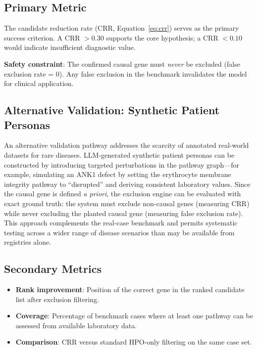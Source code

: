 \documentclass[12pt,a4paper]{article}
\begin{document}
\subsection{Primary Metric}

The candidate reduction rate (CRR, Equation~\eqref{eq:crr}) serves as the primary success criterion. A CRR $> 0.30$ supports the core hypothesis; a CRR $< 0.10$ would indicate insufficient diagnostic value.

\textbf{Safety constraint}: The confirmed causal gene must \emph{never} be excluded (false exclusion rate = 0). Any false exclusion in the benchmark invalidates the model for clinical application.

\subsection{Alternative Validation: Synthetic Patient Personas}

An alternative validation pathway addresses the scarcity of annotated real-world datasets for rare diseases. LLM-generated synthetic patient personas can be constructed by introducing targeted perturbations in the pathway graph---for example, simulating an ANK1 defect by setting the erythrocyte membrane integrity pathway to ``disrupted'' and deriving consistent laboratory values. Since the causal gene is defined \emph{a priori}, the exclusion engine can be evaluated with exact ground truth: the system must exclude non-causal genes (measuring CRR) while never excluding the planted causal gene (measuring false exclusion rate). This approach complements the real-case benchmark and permits systematic testing across a wider range of disease scenarios than may be available from registries alone.

\subsection{Secondary Metrics}

\begin{itemize}
    \item \textbf{Rank improvement}: Position of the correct gene in the ranked candidate list after exclusion filtering.
    \item \textbf{Coverage}: Percentage of benchmark cases where at least one pathway can be assessed from available laboratory data.
    \item \textbf{Comparison}: CRR versus standard HPO-only filtering on the same case set.
\end{itemize}
\end{document}
